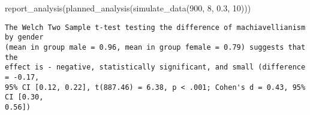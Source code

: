 \documentclass[psych,tutorial,accept,moreauthors,pdftex]{Definitions/mdpi}
\newenvironment{Shaded}{\begin{snugshade}}{\end{snugshade}}
\newcommand{\DecValTok}[1]{\textcolor[rgb]{0.00,0.00,0.81}{#1}}
\newcommand{\FloatTok}[1]{\textcolor[rgb]{0.00,0.00,0.81}{#1}}
\newcommand{\FunctionTok}[1]{\textcolor[rgb]{0.00,0.00,0.00}{#1}}
\newcommand{\NormalTok}[1]{#1}
\begin{document}
\nointerlineskip
\begin{adjustwidth}{0.5cm}{0cm} 
\begin{Shaded}
\begin{Highlighting}[]
\FunctionTok{report\_analysis}\NormalTok{(}\FunctionTok{planned\_analysis}\NormalTok{(}\FunctionTok{simulate\_data}\NormalTok{(}\DecValTok{900}\NormalTok{, }\DecValTok{8}\NormalTok{, }\FloatTok{0.3}\NormalTok{, }\DecValTok{10}\NormalTok{)))}
\end{Highlighting}
\end{Shaded}

\begin{verbatim}
The Welch Two Sample t-test testing the difference of machiavellianism by gender
(mean in group male = 0.96, mean in group female = 0.79) suggests that the
effect is - negative, statistically significant, and small (difference = -0.17,
95% CI [0.12, 0.22], t(887.46) = 6.38, p < .001; Cohen's d = 0.43, 95% CI [0.30,
0.56])
\end{verbatim}
\end{adjustwidth}
\end{document}
